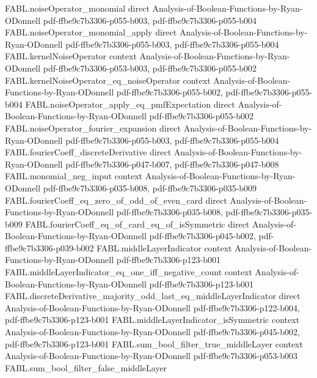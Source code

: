 \begin{theorem}
  {FABL.noiseOperator_monomial}
  {direct}
  {Analysis-of-Boolean-Functions-by-Ryan-ODonnell}
  {pdf-ffbe9c7b3306-p055-b003,
    pdf-ffbe9c7b3306-p055-b004}
\proofstep
  {FABL.noiseOperator_monomial_apply}
  {direct}
  {Analysis-of-Boolean-Functions-by-Ryan-ODonnell}
  {pdf-ffbe9c7b3306-p055-b003,
    pdf-ffbe9c7b3306-p055-b004}
\proofstep
  {FABL.kernelNoiseOperator}
  {context}
  {Analysis-of-Boolean-Functions-by-Ryan-ODonnell}
  {pdf-ffbe9c7b3306-p053-b003,
    pdf-ffbe9c7b3306-p055-b002}
\proofstep
  {FABL.kernelNoiseOperator_eq_noiseOperator}
  {context}
  {Analysis-of-Boolean-Functions-by-Ryan-ODonnell}
  {pdf-ffbe9c7b3306-p055-b002,
    pdf-ffbe9c7b3306-p055-b004}
\proofstep
  {FABL.noiseOperator_apply_eq_pmfExpectation}
  {direct}
  {Analysis-of-Boolean-Functions-by-Ryan-ODonnell}
  {pdf-ffbe9c7b3306-p055-b002}
\proofstep
  {FABL.noiseOperator_fourier_expansion}
  {direct}
  {Analysis-of-Boolean-Functions-by-Ryan-ODonnell}
  {pdf-ffbe9c7b3306-p055-b003,
    pdf-ffbe9c7b3306-p055-b004}
\proofstep
  {FABL.fourierCoeff_discreteDerivative}
  {direct}
  {Analysis-of-Boolean-Functions-by-Ryan-ODonnell}
  {pdf-ffbe9c7b3306-p047-b007,
    pdf-ffbe9c7b3306-p047-b008}
\proofstep
  {FABL.monomial_neg_input}
  {context}
  {Analysis-of-Boolean-Functions-by-Ryan-ODonnell}
  {pdf-ffbe9c7b3306-p035-b008,
    pdf-ffbe9c7b3306-p035-b009}
\proofstep
  {FABL.fourierCoeff_eq_zero_of_odd_of_even_card}
  {direct}
  {Analysis-of-Boolean-Functions-by-Ryan-ODonnell}
  {pdf-ffbe9c7b3306-p035-b008,
    pdf-ffbe9c7b3306-p035-b009}
\proofstep
  {FABL.fourierCoeff_eq_of_card_eq_of_isSymmetric}
  {direct}
  {Analysis-of-Boolean-Functions-by-Ryan-ODonnell}
  {pdf-ffbe9c7b3306-p045-b002,
    pdf-ffbe9c7b3306-p039-b002}
\proofstep
  {FABL.middleLayerIndicator}
  {context}
  {Analysis-of-Boolean-Functions-by-Ryan-ODonnell}
  {pdf-ffbe9c7b3306-p123-b001}
\proofstep
  {FABL.middleLayerIndicator_eq_one_iff_negative_count}
  {context}
  {Analysis-of-Boolean-Functions-by-Ryan-ODonnell}
  {pdf-ffbe9c7b3306-p123-b001}
\proofstep
  {FABL.discreteDerivative_majority_odd_last_eq_middleLayerIndicator}
  {direct}
  {Analysis-of-Boolean-Functions-by-Ryan-ODonnell}
  {pdf-ffbe9c7b3306-p122-b004,
    pdf-ffbe9c7b3306-p123-b001}
\proofstep
  {FABL.middleLayerIndicator_isSymmetric}
  {context}
  {Analysis-of-Boolean-Functions-by-Ryan-ODonnell}
  {pdf-ffbe9c7b3306-p045-b002,
    pdf-ffbe9c7b3306-p123-b001}
\proofstep
  {FABL.sum_bool_filter_true_middleLayer}
  {context}
  {Analysis-of-Boolean-Functions-by-Ryan-ODonnell}
  {pdf-ffbe9c7b3306-p053-b003}
\proofstep
  {FABL.sum_bool_filter_false_middleLayer}

\end{theorem}
